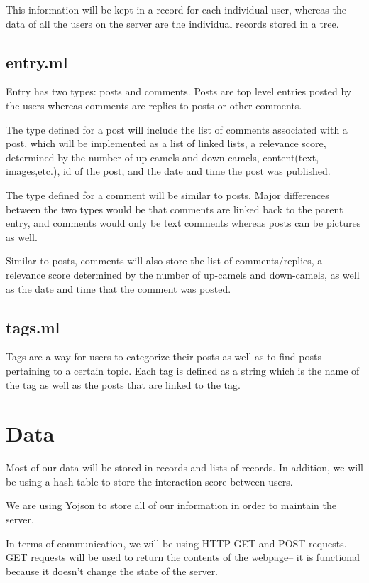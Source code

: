 \documentclass[11pt]{article}
\begin{document}
This information will be kept in a record for each individual user, whereas the data of all the users on the server are the individual records stored in a tree. 

\subsection{entry.ml}
Entry has two types: posts and comments. Posts are top level entries posted by the users whereas comments are replies to posts or other comments. 

The type defined for a post will include the list of comments associated with a post, which will be implemented as a list of linked lists, a relevance score, determined by the number of up-camels and down-camels, content(text, images,etc.), id of the post, and the date and time the post was published.

The type defined for a comment will be similar to posts. Major differences between the two types would be that comments are linked back to the parent entry, and comments would only be text comments whereas posts can be pictures as well. 

Similar to posts, comments will also store the list of comments/replies, a relevance score determined by the number of up-camels and down-camels, as well as the date and time that the comment was posted. 

\subsection{tags.ml}
Tags are a way for users to categorize their posts as well as to find posts pertaining to a certain topic. Each tag is defined as a string which is the name of the tag as well as the posts that are linked to the tag. 

\section{Data}

Most of our data will be stored in records and lists of records. In addition, we will be using a hash table to store the interaction score between users. 

We are using Yojson to store all of our information in order to maintain the server. 

In terms of communication, we will be using HTTP GET and POST requests. GET requests will be used to return the contents of the webpage-- it is functional because it doesn’t change the state of the server.
\end{document}
